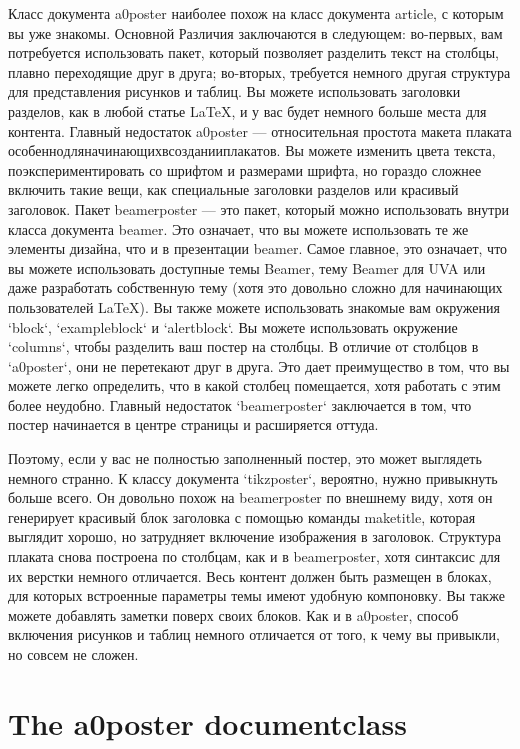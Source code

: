 \documentclass{article}
\begin{document}
Класс документа a0poster наиболее похож на класс документа article, с которым вы уже знакомы.
Основной Различия заключаются в следующем: во-первых, вам потребуется использовать пакет, который
позволяет разделить текст на столбцы, плавно переходящие друг в друга;
во-вторых, требуется немного другая структура для представления рисунков и таблиц. Вы
можете использовать заголовки разделов, как в любой статье LaTeX, и у вас будет немного
больше места для контента. Главный недостаток a0poster — относительная простота
макета плаката \(особенно для начинающих в создании плакатов\). Вы можете изменить
цвета текста, поэкспериментировать со шрифтом и размерами шрифта, но гораздо сложнее
включить такие вещи, как специальные заголовки разделов или красивый заголовок.
Пакет beamerposter — это пакет, который можно использовать внутри класса документа beamer. Это означает, что вы можете использовать те же элементы дизайна, что и в презентации beamer. Самое главное, это означает, что вы можете использовать доступные темы Beamer, тему Beamer для UVA или даже разработать собственную тему (хотя это довольно сложно для начинающих пользователей LaTeX). Вы также можете использовать знакомые вам окружения `block`, `exampleblock` и `alertblock`. Вы можете использовать окружение `columns`, чтобы разделить ваш постер на столбцы.
В отличие от столбцов в `a0poster`, они не перетекают друг в друга. Это дает преимущество в том, что вы можете легко определить, что в какой столбец помещается, хотя работать с этим
более неудобно. Главный недостаток `beamerposter` заключается в том, что постер начинается в центре страницы и расширяется оттуда.

Поэтому, если у вас не полностью заполненный постер, это может выглядеть немного странно.
К классу документа `tikzposter`, вероятно, нужно привыкнуть больше всего. Он
довольно похож на beamerposter по внешнему виду, хотя он генерирует красивый блок заголовка с помощью
команды maketitle, которая выглядит хорошо, но затрудняет включение
изображения в заголовок. Структура плаката снова построена по столбцам,
как и в beamerposter, хотя синтаксис для их верстки немного
отличается. Весь контент должен быть размещен в блоках, для которых встроенные параметры темы
имеют удобную компоновку. Вы также можете добавлять заметки поверх своих блоков. Как и в a0poster, способ включения рисунков и таблиц немного отличается от
того, к чему вы привыкли, но совсем не сложен.


  \section{The a0poster documentclass}
  \label{sec:aposter}
\end{document}
